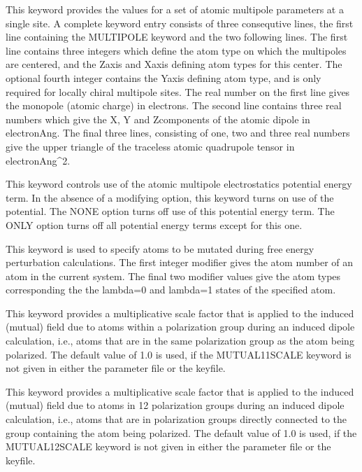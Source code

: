 \documentclass[letterpaper,11pt,english]{sphinxmanual}
\begin{document}
  This keyword provides the values for a set of atomic multipole parameters at a single site. A complete keyword entry consists of three consequtive lines, the first line containing the MULTIPOLE keyword and the two following lines. The first line contains three integers which define the atom type on which the multipoles are centered, and the Z\sphinxhyphen{}axis and X\sphinxhyphen{}axis defining atom types for this center. The optional fourth integer contains the Y\sphinxhyphen{}axis defining atom type, and is only required for locally chiral multipole sites. The real number on the first line gives the monopole (atomic charge) in electrons. The second line contains three real numbers which give the X\sphinxhyphen{}, Y\sphinxhyphen{} and Z\sphinxhyphen{}components of the atomic dipole in electron\sphinxhyphen{}Ang. The final three lines, consisting of one, two and three real numbers give the upper triangle of the traceless atomic quadrupole tensor in electron\sphinxhyphen{}Ang\textasciicircum{}2.

  This keyword controls use of the atomic multipole electrostatics potential energy term. In the absence of a modifying option, this keyword turns on use of the potential. The NONE option turns off use of this potential energy term. The ONLY option turns off all potential energy terms except for this one.

  This keyword is used to specify atoms to be mutated during free energy perturbation calculations. The first integer modifier gives the atom number of an atom in the current system. The final two modifier values give the atom types corresponding the the lambda=0 and lambda=1 states of the specified atom.

  This keyword provides a multiplicative scale factor that is applied to the induced (mutual) field due to atoms within a polarization group during an induced dipole calculation, i.e., atoms that are in the same polarization group as the atom being polarized. The default value of 1.0 is used, if the MUTUAL\sphinxhyphen{}11\sphinxhyphen{}SCALE keyword is not given in either the parameter file or the keyfile.

  This keyword provides a multiplicative scale factor that is applied to the induced (mutual) field due to atoms in 1\sphinxhyphen{}2 polarization groups during an induced dipole calculation, i.e., atoms that are in polarization groups directly connected to the group containing the atom being polarized. The default value of 1.0 is used, if the MUTUAL\sphinxhyphen{}12\sphinxhyphen{}SCALE keyword is not given in either the parameter file or the keyfile.
\end{document}

